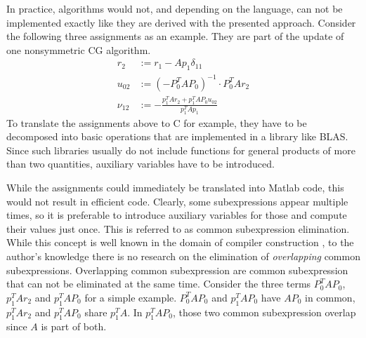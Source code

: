 
In practice, algorithms would not, and depending on the language, can not be implemented exactly like they are derived with the presented approach. Consider the following three assignments as an example. They are part of the update of one nonsymmetric CG algorithm.
%
\begin{align*}
r_2 &:= r_1 - A p_1 \delta_{11} \\
u_{02} &:= \left(- P_0^T A P_0 \right)^{-1} \cdot P_0^T A r_2 \\
\nu_{12} &:= - \frac{p_1^T A r_2 + p_1^T A P_0 u_{02}}{p_1^T A p_1}
\end{align*}
%
To translate the assignments above to C for example, they have to be decomposed into basic operations that are implemented in a library like BLAS. Since such libraries usually do not include functions for general products of more than two quantities, auxiliary variables have to be introduced.

While the assignments could immediately be translated into Matlab code, this would not result in efficient code. Clearly, some subexpressions appear multiple times, so it is preferable to introduce auxiliary variables for those and compute their values just once. This is referred to as common subexpression elimination. While this concept is well known in the domain of compiler construction \cite{steven1997advanced}, to the author's knowledge there is no research on the elimination of \emph{overlapping} common subexpressions. Overlapping common subexpression are common subexpression that can not be eliminated at the same time. Consider the three terms $P_0^T A P_0$, $p_1^T A r_2$ and $p_1^T A P_0$ for a simple example. $P_0^T A P_0$ and $p_1^T A P_0$ have $AP_0$ in common, $p_1^T A r_2$ and $p_1^T A P_0$ share $p_1^T A$. In $p_1^T A P_0$, those two common subexpression overlap since $A$ is part of both.

